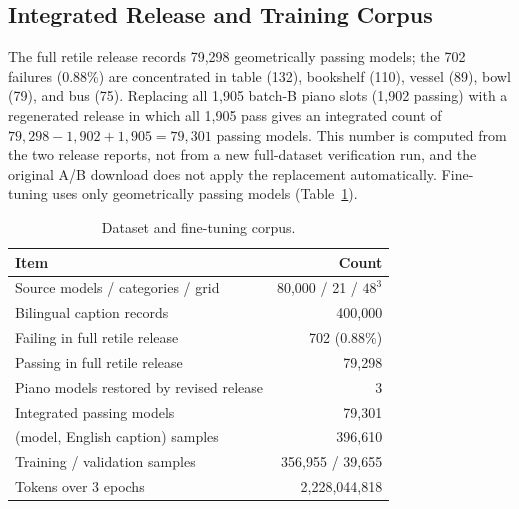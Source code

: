 \documentclass[letterpaper]{article} %
\begin{document}
\subsection{Integrated Release and Training Corpus}
The full retile release records 79,298 geometrically passing models; the 702 failures (0.88\%) are concentrated in table (132), bookshelf (110), vessel (89), bowl (79), and bus (75). Replacing all 1,905 batch-B piano slots (1,902 passing) with a regenerated release in which all 1,905 pass gives an integrated count of $79{,}298-1{,}902+1{,}905=79{,}301$ passing models. This number is computed from the two release reports, not from a new full-dataset verification run, and the original A/B download does not apply the replacement automatically. Fine-tuning uses only geometrically passing models (Table~\ref{tab:training-data}).

\begin{table}[t]
\centering
\small
\setlength{\tabcolsep}{4pt}
\begin{tabular}{lr}
\toprule
Item & Count \\
\midrule
Source models / categories / grid & 80,000 / 21 / $48^3$ \\
Bilingual caption records & 400,000 \\
Failing in full retile release & 702 (0.88\%) \\
Passing in full retile release & 79,298 \\
Piano models restored by revised release & 3 \\
Integrated passing models & 79,301 \\
(model, English caption) samples & 396,610 \\ %
Training / validation samples & 356,955 / 39,655 \\
Tokens over 3 epochs & 2,228,044,818 \\ %
\bottomrule
\end{tabular}
\caption{Dataset and fine-tuning corpus.}
\label{tab:training-data}
\end{table}
\end{document}

